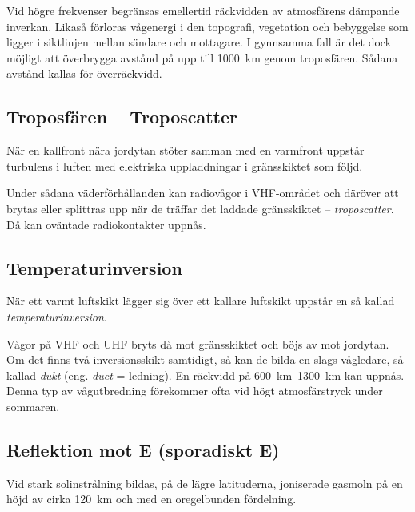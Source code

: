 Vid högre frekvenser begränsas emellertid räckvidden av atmosfärens
dämpande inverkan.
Likaså förloras vågenergi i den topografi, vegetation och bebyggelse som ligger
i siktlinjen mellan sändare och mottagare.
I gynnsamma fall är det dock möjligt att överbrygga avstånd på upp till
\SI{1000}{\kilo\metre} genom troposfären.
Sådana avstånd kallas för överräckvidd.

\subsection{Troposfären -- Troposcatter}

När en kallfront nära jordytan stöter samman med en varmfront uppstår turbulens
i luften med elektriska uppladdningar i gränsskiktet som följd.

Under sådana väderförhållanden kan radiovågor i VHF-området och däröver att
brytas eller splittras upp när de träffar det laddade gränsskiktet --
\emph{troposcatter}.
Då kan oväntade radiokontakter uppnås.

\subsection{Temperaturinversion}

När ett varmt luftskikt lägger sig över ett kallare luftskikt uppstår
en så kallad \emph{temperaturinversion}.

Vågor på VHF och UHF bryts då mot gränsskiktet och böjs av mot jordytan.
Om det finns två inversionsskikt samtidigt, så kan de bilda
en slags vågledare, så kallad \emph{dukt} (eng. \emph{duct} = ledning).
En räckvidd på \SIrange{600}{1300}{\kilo\metre} kan uppnås.
Denna typ av vågutbredning förekommer ofta vid högt atmosfärstryck under
sommaren.

\subsection{Reflektion mot E\raisebox{-.4ex}{s} (sporadiskt E)}

Vid stark solinstrålning bildas, på de lägre latituderna, joniserade gasmoln på
en höjd av cirka \SI{120}{\kilo\metre} och med en oregelbunden fördelning.

